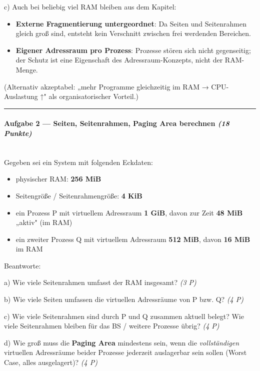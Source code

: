 \documentclass[11pt, a4paper]{article}
\begin{document}
c) Auch bei beliebig viel RAM bleiben aus dem Kapitel:

\begin{itemize}
  \item \textbf{Externe Fragmentierung untergeordnet}: Da Seiten und Seitenrahmen gleich groß sind, entsteht kein Verschnitt zwischen frei werdenden Bereichen.
  \item \textbf{Eigener Adressraum pro Prozess}: Prozesse stören sich nicht gegenseitig; der Schutz ist eine Eigenschaft des Adressraum-Konzepts, nicht der RAM-Menge.
\end{itemize}

(Alternativ akzeptabel: „mehr Programme gleichzeitig im RAM → CPU-Auslastung ↑" als organisatorischer Vorteil.)



\noindent\textcolor{rulegray}{\rule{\linewidth}{0.4pt}}


\paragraph{Aufgabe 2 — Seiten, Seitenrahmen, Paging Area berechnen \textit{(18 Punkte)}}\mbox{}\\[2pt]

Gegeben sei ein System mit folgenden Eckdaten:


\begin{itemize}
  \item physischer RAM: \textbf{256 MiB}
  \item Seitengröße / Seitenrahmengröße: \textbf{4 KiB}
  \item ein Prozess P mit virtuellem Adressraum \textbf{1 GiB}, davon zur Zeit \textbf{48 MiB} „aktiv" (im RAM)
  \item ein zweiter Prozess Q mit virtuellem Adressraum \textbf{512 MiB}, davon \textbf{16 MiB} im RAM
\end{itemize}

Beantworte:


a) Wie viele Seitenrahmen umfasst der RAM insgesamt? \textit{(3 P)}


b) Wie viele Seiten umfassen die virtuellen Adressräume von P bzw. Q? \textit{(4 P)}


c) Wie viele Seitenrahmen sind durch P und Q zusammen aktuell belegt? Wie viele Seitenrahmen bleiben für das BS / weitere Prozesse übrig? \textit{(4 P)}


d) Wie groß muss die \textbf{Paging Area} mindestens sein, wenn die \textit{vollständigen} virtuellen Adressräume beider Prozesse jederzeit auslagerbar sein sollen (Worst Case, alles ausgelagert)? \textit{(4 P)}
\end{document}
